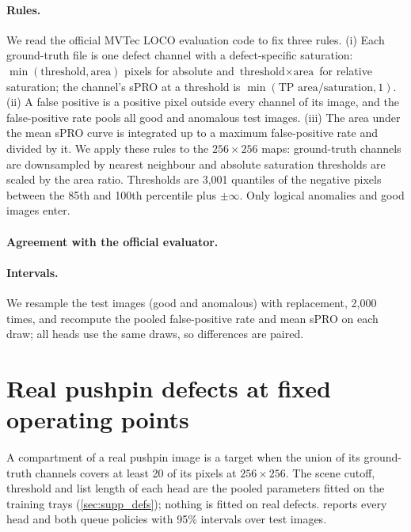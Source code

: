 \paragraph{Rules.} We read the official MVTec LOCO evaluation code to fix three rules. (i) Each ground-truth file is one defect channel with a defect-specific saturation: $\min(\text{threshold},\text{area})$ pixels for absolute and $\text{threshold}\times\text{area}$ for relative saturation; the channel's sPRO at a threshold is $\min(\text{TP area}/\text{saturation},1)$. (ii) A false positive is a positive pixel outside every channel of its image, and the false-positive rate pools all good and anomalous test images. (iii) The area under the mean sPRO curve is integrated up to a maximum false-positive rate and divided by it. We apply these rules to the $256{\times}256$ maps: ground-truth channels are downsampled by nearest neighbour and absolute saturation thresholds are scaled by the area ratio. Thresholds are 3{,}001 quantiles of the negative pixels between the 85th and 100th percentile plus $\pm\infty$. Only logical anomalies and good images enter.
\paragraph{Agreement with the official evaluator.} \officialSentence
\paragraph{Intervals.} We resample the test images (good and anomalous) with replacement, 2{,}000 times, and recompute the pooled false-positive rate and mean sPRO on each draw; all heads use the same draws, so differences are paired.
\begin{table}[t]
\centering
\caption{Native logical anomalies in every category with a retrained pair: AU-sPRO up to 5\% FPR (\%) with 95\% intervals, and image AUROC (\%).}
\label{tab:native_full}
\footnotesize\setlength{\tabcolsep}{3pt}

\end{table}
\section{Real pushpin defects at fixed operating points}
\label{sec:supp_op}
A compartment of a real pushpin image is a target when the union of its ground-truth channels covers at least 20 of its pixels at $256{\times}256$. The scene cutoff, threshold and list length of each head are the pooled parameters fitted on the training trays (\cref{sec:supp_defs}); nothing is fitted on real defects.  reports every head and both queue policies with 95\% intervals over test images.
